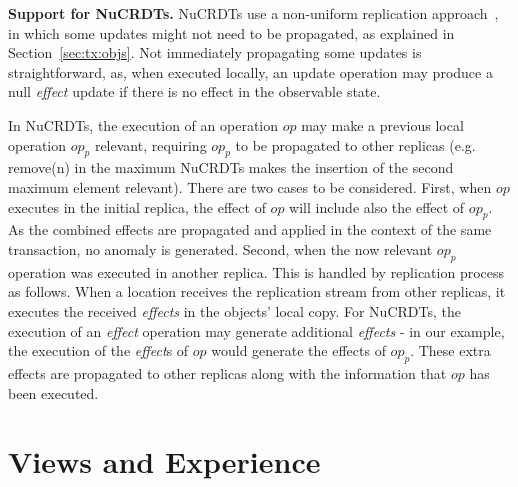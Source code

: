 \documentclass[sigplan,twocolumn,review,anonymous]{acmart}
\newcommand{\code}[1]{\textsf{\small{#1}}}
\begin{document}
\textbf{Support for NuCRDTs.}
\label{subsec:nonuniform}
NuCRDTs use a non-uniform replication approach~\cite{Cabrita17Nonuniform}, in which some 
updates might not need to be propagated, as explained in Section~\ref{sec:tx:objs}.
Not immediately propagating some updates is straightforward, as, when executed locally, 
an update operation may produce a null \emph{effect} update if there is no
effect in the observable state.


In NuCRDTs, the execution of an operation $op$ may make a previous local operation  $op_{p}$
relevant, requiring $op_{p}$ to be propagated to other replicas  
(e.g.  \code{remove(n)} in the maximum NuCRDTs makes the insertion of the second
maximum element relevant). There are two cases to be considered.
%
First, when $op$ executes in the initial replica, the effect of
$op$ will include also the effect of $op_{p}$. As the combined effects are propagated and applied in 
the context of the same transaction, no anomaly is generated.
%
Second, when the now relevant $op_{p}$ operation was executed in  
another replica. This is handled by replication process as follows.  When a location receives
the replication stream from other replicas, it executes the received \emph{effects} in the objects' local copy.
For NuCRDTs, the execution of an \emph{effect} operation may generate additional 
\emph{effects} - in our example, the execution of the \emph{effect}s of $op$ would generate
the effects of $op_{p}$. These extra effects are propagated to other replicas
along with the 
information that $op$ has been executed.


\section{Views and Experience}
\label{sec:views_for_apps}
\end{document}
